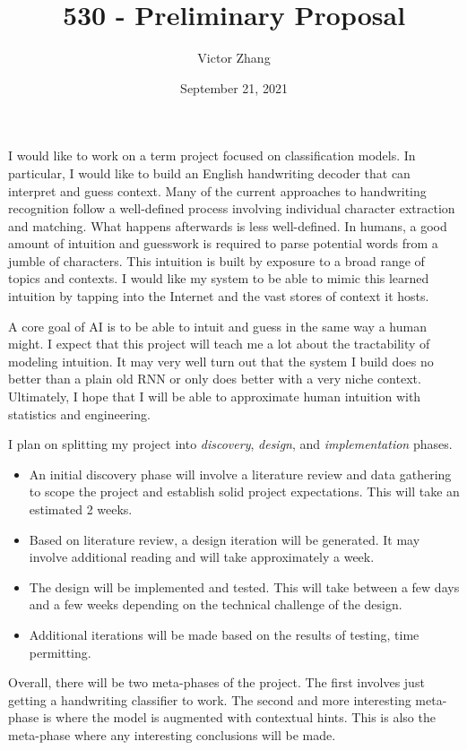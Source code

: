 \documentclass{article}
\title{530 - Preliminary Proposal}
\author{Victor Zhang}
\date{September 21, 2021}
\begin{document}
\maketitle

I would like to work on a term project focused on  classification models. In particular, I would like to build an English handwriting decoder that can interpret and guess context. Many of the current approaches to handwriting recognition follow a well-defined process involving individual character extraction and matching. What happens afterwards is less well-defined. In humans, a good amount of intuition and guesswork is required to parse potential words from a jumble of characters. This intuition is built by exposure to a broad range of topics and contexts. I would like my system to be able to mimic this learned intuition by tapping into the Internet and the vast stores of context it hosts.

A core goal of AI is to be able to intuit and guess in the same way a human might. I expect that this project will teach me a lot about the tractability of modeling intuition. It may very well turn out that the system I build does no better than a plain old RNN or only does better with a very niche context. Ultimately, I hope that I will be able to approximate human intuition with statistics and engineering.

I plan on splitting my project into \textit{discovery}, \textit{design}, and \textit{implementation} phases.
\begin{itemize}
  \item An initial discovery phase will involve a literature review and data gathering to scope the project and establish solid project expectations. This will take an estimated 2 weeks.
  \item Based on literature review, a design iteration will be generated. It may involve additional reading and will take approximately a week.
  \item The design will be implemented and tested. This will take between a few days and a few weeks depending on the technical challenge of the design.
  \item Additional iterations will be made based on the results of testing, time permitting.
\end{itemize}
Overall, there will be two meta-phases of the project. The first involves just getting a handwriting classifier to work. The second and more interesting meta-phase is where the model is augmented with contextual hints. This is also the  meta-phase where any interesting conclusions will be made.
\end{document}
